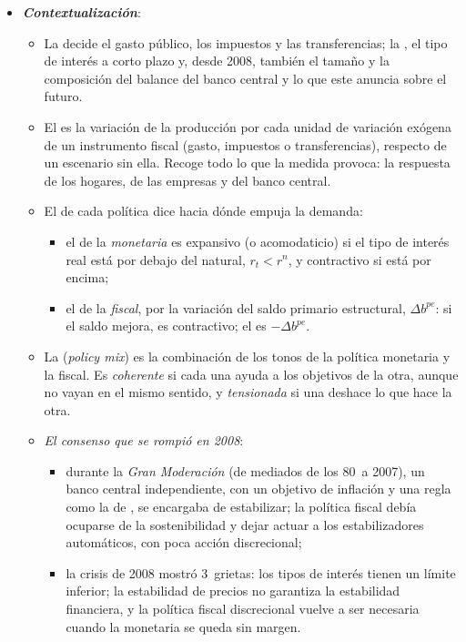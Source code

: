 \documentclass[11pt]{article}
\begin{document}
\begin{itemize}
\item \textbf{\emph{Contextualización}}:
  \begin{itemize}
  \item La  decide el gasto público, los impuestos y las transferencias; la , el tipo de interés a corto plazo y, desde 2008, también el tamaño y la composición del balance del banco central y lo que este anuncia sobre el futuro.
  \item El  es la variación de la producción por cada unidad de variación exógena de un instrumento fiscal (gasto, impuestos o transferencias), respecto de un escenario sin ella. Recoge todo lo que la medida provoca: la respuesta de los hogares, de las empresas y del banco central.
  \item El  de cada política dice hacia dónde empuja la demanda:
    \begin{itemize}
    \item el de la \emph{monetaria} es expansivo (o acomodaticio) si el tipo de interés real está por debajo del natural, $r_t<r^n$, y contractivo si está por encima;
    \item el de la \emph{fiscal}, por la variación del saldo primario estructural, $\Delta b^{pe}$: si el saldo mejora, es contractivo; el  es $-\Delta b^{pe}$.
    \end{itemize}
  \item La  (\emph{policy mix}) es la combinación de los tonos de la política monetaria y la fiscal. Es \emph{coherente} si cada una ayuda a los objetivos de la otra, aunque no vayan en el mismo sentido, y \emph{tensionada} si una deshace lo que hace la otra.
  \item \emph{El consenso que se rompió en 2008}:
    \begin{itemize}
    \item durante la \emph{Gran Moderación} (de mediados de los 80~a 2007), un banco central independiente, con un objetivo de inflación y una regla como la de \textcite{Taylor1993}, se encargaba de estabilizar; la política fiscal debía ocuparse de la sostenibilidad y dejar actuar a los estabilizadores automáticos, con poca acción discrecional;
    \item la crisis de 2008 mostró 3~grietas\nocite{BlanchardDellAricciaMauro2010}: los tipos de interés tienen un límite inferior; la estabilidad de precios no garantiza la estabilidad financiera, y la política fiscal discrecional vuelve a ser necesaria cuando la monetaria se queda sin margen.
    \end{itemize}
  \end{itemize}


\end{itemize}
\end{document}
